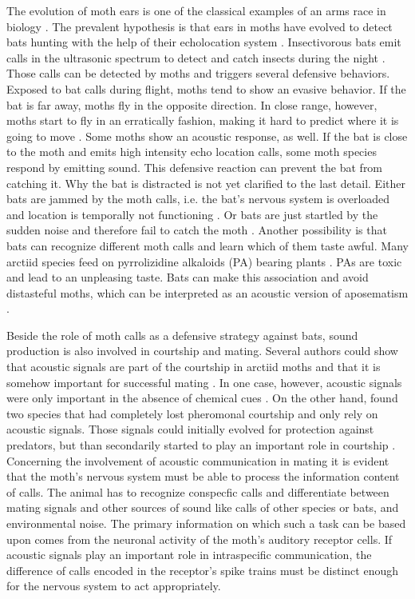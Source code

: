 \documentclass[12pt,a4paper,pdftex]{article}
\begin{document}
The evolution of moth ears is one of the classical examples of an arms race in biology \cite{hofstede2016}. The prevalent hypothesis is that ears in moths have evolved to detect bats hunting with the help of their echolocation system \cite{roeder1961detection, miller2001, ratcliffe2009, conner2012}. Insectivorous bats emit calls in the ultrasonic spectrum to detect and catch insects during the night \cite{schnitzler2001}. Those calls can be detected by moths and triggers several defensive behaviors. Exposed to bat calls during flight, moths tend to show an evasive behavior. If the bat is far away, moths fly in the opposite direction. In close range, however, moths start to fly in an erratically fashion, making it hard to predict where it is going to move \cite{roeder1961detection, acharya1999}. Some moths show an acoustic response, as well. If the bat is close to the moth and emits high intensity echo location calls, some moth species respond by emitting sound. This defensive reaction can prevent the bat from catching it. Why the bat is distracted is not yet clarified to the last detail. Either bats are jammed by the moth calls, i.e. the bat's nervous system is overloaded and location is temporally not functioning \cite{corcoran2010, corcoran2011, conner2012}. Or bats are just startled by the sudden noise and therefore fail to catch the moth \cite{fullard1977}. Another possibility is that bats can recognize different moth calls and learn which of them taste awful. Many arctiid species feed on pyrrolizidine alkaloids (PA) bearing plants \cite{boppre2011, ratcliffe2005}. PAs are toxic and lead to an unpleasing taste. Bats can make this association and avoid distasteful moths, which can be interpreted as an acoustic version of aposematism \cite{eckrich1990chemical, hristov2005, miller2001}. 

Beside the role of moth calls as a defensive strategy against bats, sound production is also involved in courtship and mating. Several authors could show that acoustic signals are part of the courtship in arctiid moths and that it is somehow important for successful mating \cite{sanderford1990, simmons1996, sanderford1998}. In one case, however, acoustic signals were only important in the absence of chemical cues \cite{conner1987}. On the other hand, \cite{weller1999} found two species that had completely lost pheromonal courtship and only rely on acoustic signals. Those signals could initially evolved for protection against predators, but than secondarily started to play an important role in courtship \cite{simmons1996, phelan1997evolution, weller1999}. Concerning the involvement of acoustic communication in mating it is evident that the moth's nervous system must be able to process the information content of calls. The animal has to recognize conspecfic calls and differentiate between mating signals and other sources of sound like calls of other species or bats, and environmental noise. The primary information on which such a task can be based upon comes from the neuronal activity of the moth's auditory receptor cells. If acoustic signals play an important role in intraspecific communication, the difference of calls encoded in the receptor's spike trains must be distinct enough for the nervous system to act appropriately. 
\end{document}
